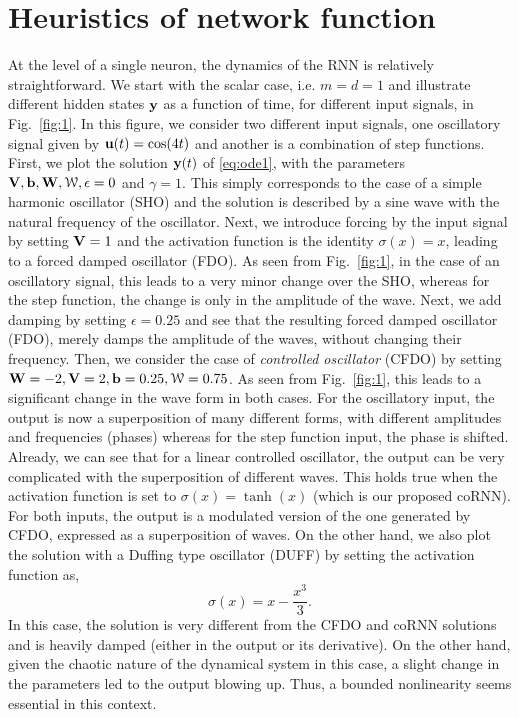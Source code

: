 \documentclass{article} \usepackage{iclr2021_conference,times}
\newcommand{\cW}{\EuScript{W}}
\newcommand{\by}{{\bf y}}
\newcommand{\bW}{{\bf W}}
\newcommand{\bu}{{\bf u}}
\newcommand{\bb}{{\bf b}}
\newcommand{\bV}{{\bf V}}
\newcommand{\ep}{\epsilon}
\newcommand{\fref}[1] {Fig.~\ref{#1}}
\begin{document}
\section{Heuristics of network function}
\label{app:heuristics}
At the level of a single neuron, the dynamics of the RNN is relatively straightforward. We start with the scalar case, i.e. $m=d =1$ and illustrate different hidden states $\by$ as a function of time, for different input signals, in \fref{fig:1}. In this figure, we consider two different input signals, one oscillatory signal given by $\bu(t) = \cos(4t)$ and another is a combination of step functions. First, we plot the solution $\by(t)$ of \eqref{eq:ode1}, with the parameters $\bV,\bb,\bW,\cW,\ep=0$ and $\gamma=1$. This simply corresponds to the case of a simple harmonic oscillator (SHO) and the solution is described by a sine wave with the natural frequency of the oscillator. Next, we introduce forcing by the input signal by setting $\bV=1$ and the activation function is the identity $\sigma(x) =x $, leading to a forced damped oscillator (FDO). As seen from \fref{fig:1}, in the case of an oscillatory signal, this leads to a very minor change over the SHO, whereas for the step function, the change is only in the amplitude of the wave. Next, we add damping by setting $\ep=0.25$ and see that the resulting forced damped oscillator (FDO), merely damps the amplitude of the waves, without changing their frequency. Then, we consider the case of \emph{controlled oscillator} (CFDO) by setting $\bW=-2,\bV = 2, \bb = 0.25,\cW=0.75$. As seen from \fref{fig:1}, this leads to a significant change in the wave form in both cases. For the oscillatory input, the output is now a superposition of many different forms, with different amplitudes and frequencies (phases) whereas for the step function input, the phase is shifted. Already, we can see that for a linear controlled oscillator, the output can be very complicated with the superposition of different waves. This holds true when the activation function is set to $\sigma(x) = \tanh(x)$ (which is our proposed coRNN). For both inputs, the output is a modulated version of the one generated by CFDO, expressed as a superposition of waves. On the other hand, we also plot the solution with a Duffing type oscillator (DUFF) by setting the activation function as,
\begin{equation}
    \sigma(x) = x - \frac{x^3}{3}.
\end{equation}
In this case, the solution is very different from the CFDO and coRNN solutions and is heavily damped (either in the output or its derivative). On the other hand, given the chaotic nature of the dynamical system in this case, a slight change in the parameters led to the output blowing up. Thus, a bounded nonlinearity seems essential in this context. 
\end{document}
